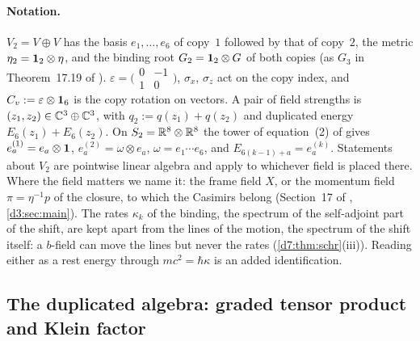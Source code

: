 \paragraph{Notation.} $V_2=V\oplus V$ has the basis $e_1,\dots,e_6$ of copy~$1$ followed by that of copy~$2$, the metric
$\eta_2=\mathbf 1_2\otimes\eta$, and the binding root $G_2=\mathbf 1_2\otimes G$ of both copies (as $G_3$ in Theorem~17.19 of \cite{ES17}).
$\varepsilon=\bigl(\begin{smallmatrix}0&-1\\1&0\end{smallmatrix}\bigr)$, $\sigma_x$, $\sigma_z$ act on the copy index, and
$C_v:=\varepsilon\otimes\mathbf 1_6$ is the copy rotation on vectors. A pair of field strengths is $(z_1,z_2)\in\mathbb{C}^3\oplus\mathbb{C}^3$, with
$q_2:=q(z_1)+q(z_2)$ and duplicated energy $E_6(z_1)+E_6(z_2)$. On $S_2=\mathbb{R}^8\otimes\mathbb{R}^8$ the tower of equation~(2) of \cite{ES17} gives
$e^{(1)}_a=e_a\otimes\mathbf 1$, $e^{(2)}_a=\omega\otimes e_a$, $\omega=e_1\cdots e_6$, and $E_{6(k-1)+a}=e^{(k)}_a$. Statements about $V_2$ are
pointwise linear algebra and apply to whichever field is placed there. Where the field matters we name it: the frame field $X$, or the
momentum field $\pi=\eta^{-1}p$ of the closure, to which the Casimirs belong (Section~17 of \cite{ES17}, \cref{d3:sec:main}). The
rates $\kappa_k$ of the binding, the spectrum of the self-adjoint part of the shift, are kept apart from the lines of the motion, the
spectrum of the shift itself: a $b$-field can move the lines but never the rates (\cref{d7:thm:schr}(iii)). Reading either as a rest energy through
$mc^2=\hbar\kappa$ is an added identification.

\subsection{The duplicated algebra: graded tensor product and Klein factor}
\label{d5:sec:algebra}

